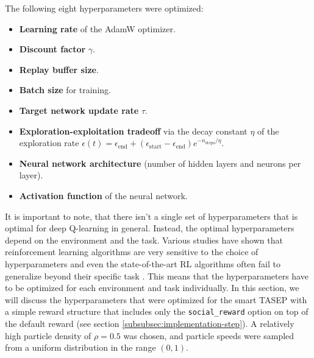 The following eight hyperparameters were optimized:
\begin{itemize}
    \item \textbf{Learning rate} of the AdamW optimizer.
    \item \textbf{Discount factor} $\gamma$.
    \item \textbf{Replay buffer size}.
    \item \textbf{Batch size} for training.
    \item \textbf{Target network update rate} $\tau$.
    \item \textbf{Exploration-exploitation tradeoff} via the decay constant $\eta$ of the exploration rate $\epsilon(t)=\epsilon_{\text{end}} + (\epsilon_{\text{start}} - \epsilon_{\text{end}}) e^{-n_{\text{steps}}/\eta}$.
    \item \textbf{Neural network architecture} (number of hidden layers and neurons per layer).
    \item \textbf{Activation function} of the neural network.
\end{itemize}
It is important to note, that there isn't a single set of hyperparameters that is optimal for deep Q-learning in general. Instead, the optimal hyperparameters depend on the environment and the task. Various studies have shown that reinforcement learning algorithms are very sensitive to the choice of hyperparameters and even the state-of-the-art RL algorithms often fail to generalize beyond their specific task \cite{parker-holder_automated_2022,henderson_deep_2019,engstrom_implementation_2020,andrychowicz_what_2020}. This means that the hyperparameters have to be optimized for each environment and task individually. In this section, we will discuss the hyperparameters that were optimized for the smart TASEP with a simple reward structure that includes only the \texttt{social\_reward} option on top of the default reward (see section \ref{subsubsec:implementation-step}). A relatively high particle density of $\rho=0.5$ was chosen, and particle speeds were sampled from a uniform distribution in the range $(0, 1)$.



